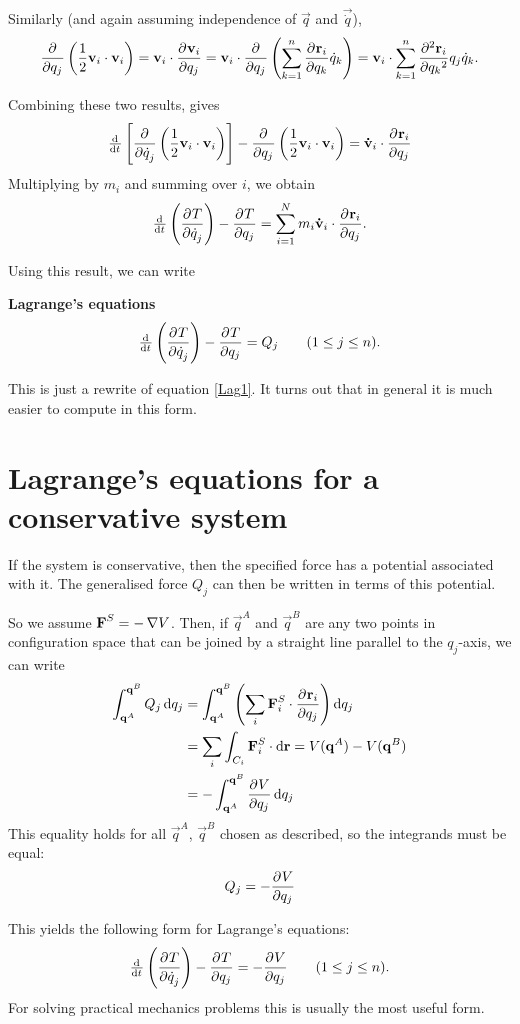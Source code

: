 Similarly (and again assuming independence of $\vec{q}$ and $\vec{\dot{q}}$),
\[ \pd{}{q_j}\left(\frac{1}{2}\vec{v}_i\cdot \vec{v}_i\right) = \vec{v}_i \cdot \pd{\vec{v}_i}{q_j} = \vec{v}_i \cdot \pd{}{q_j}\left(\sum^n_{k=1}\pd{\vec{r}_i}{q_k}\dot{q}_k\right) = \vec{v}_i\cdot \sum^n_{k=1}\pd[2]{\vec{r}_i}{q_k}{q_j}\dot{q}_k. \]

Combining these two results, gives
\[ \od{}{t}\left[\pd{}{\dot{q}_j}\left(\frac{1}{2}\vec{v}_i\cdot \vec{v}_i\right)\right] - \pd{}{q_j}\left(\frac{1}{2}\vec{v}_i\cdot \vec{v}_i\right) = \vec{\dot{v}}_i \cdot \pd{\vec{r}_i}{q_j} \]
Multiplying by $m_i$ and summing over $i$, we obtain
\[ \od{}{t}\left(\pd{T}{\dot{q}_j}\right) - \pd{T}{q_j} = \sum^N_{i=1}m_i \vec{\dot{v}}_i \cdot \pd{\vec{r}_i}{q_j}. \]

Using this result, we can write
\begin{eigenschap}
\textbf{Lagrange's equations}
\[ \od{}{t}\left(\pd{T}{\dot{q}_j}\right) - \pd{T}{q_j} = Q_j \qquad (1\leq j \leq n). \]
\end{eigenschap}
This is just a rewrite of equation \ref{Lag1}. It turns out that in general it is much easier to compute in this form.


\section{Lagrange's equations for a conservative system}

If the system is conservative, then the specified force has a potential associated with it. The generalised force $Q_j$ can then be written in terms of this potential.

So we assume $\vec{F}^S = - \grad V$. Then, if $\vec{q}^A$ and $\vec{q}^B$ are any two points in configuration space that can be joined by a straight line parallel to the $q_j$-axis, we can write
\begin{align*}
\int^{\vec{q}^B}_{\vec{q}^A} Q_j \diff{q_j} &= \int^{\vec{q}^B}_{\vec{q}^A} \left(\sum_i \vec{F}^S_i \cdot \pd{\vec{r}_i}{q_j}\right) \diff{q_j} \\
&= \sum_i \int_{C_i} \vec{F}^S_i \cdot \diff{\vec{r}} = V(\vec{q}^A) - V(\vec{q}^B) \\
&= - \int^{\vec{q}^B}_{\vec{q}^A} \pd{V}{q_j} \diff{q_j}
\end{align*}
This equality holds for all $\vec{q}^A$, $\vec{q}^B$ chosen as described, so the integrands must be equal:
\[ Q_j = - \pd{V}{q_j} \]

This yields the following form for Lagrange's equations:
\[ \od{}{t}\left(\pd{T}{\dot{q}_j}\right) - \pd{T}{q_j} = - \pd{V}{q_j} \qquad (1\leq j \leq n). \]
For solving practical mechanics problems this is usually the most useful form.

